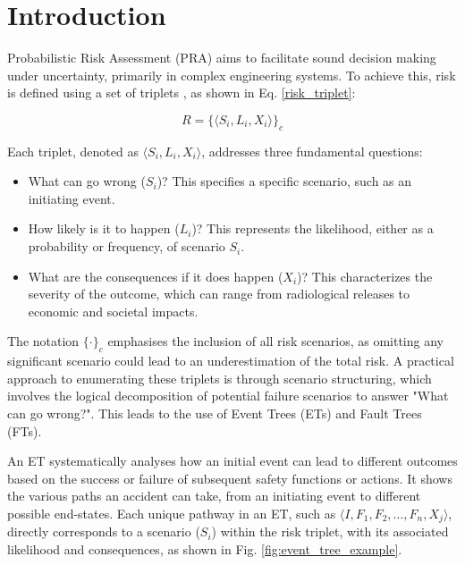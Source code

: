 \section{Introduction}
Probabilistic Risk Assessment (PRA) aims to facilitate sound decision making under uncertainty, primarily in complex engineering systems. To achieve this, risk is defined using a set of triplets \cite{kaplan_quantitative_1981}, as shown in Eq. \ref{risk_triplet}:

\begin{equation}
\label{risk_triplet}
R = \bigl\{\langle S_i, L_i, X_i \rangle\bigr\}_c
\end{equation}

Each triplet, denoted as $\langle S_i, L_i, X_i \rangle$, addresses three fundamental questions:

\begin{itemize}
  \item What can go wrong ($S_i$)? This specifies a specific scenario, such as an initiating event.
  \item How likely is it to happen ($L_i$)? This represents the likelihood, either as a probability or frequency, of scenario $S_i$.
  \item What are the consequences if it does happen ($X_i$)? This characterizes the severity of the outcome, which can range from radiological releases to economic and societal impacts.
\end{itemize}

The notation \(\{ \cdot \}_c\) emphasises the inclusion of all risk scenarios, as omitting any significant scenario could lead to an underestimation of the total risk. A practical approach to enumerating these triplets is through scenario structuring, which involves the logical decomposition of potential failure scenarios to answer "What can go wrong?". This leads to the use of Event Trees (ETs) and Fault Trees (FTs).

An ET systematically analyses how an initial event can lead to different outcomes based on the success or failure of subsequent safety functions or actions. It shows the various paths an accident can take, from an initiating event to different possible end-states. Each unique pathway in an ET, such as $\langle I, F_1, F_2, \ldots, F_n, X_j \rangle$, directly corresponds to a scenario ($S_i$) within the risk triplet, with its associated likelihood and consequences, as shown in Fig. \ref{fig:event_tree_example}.



